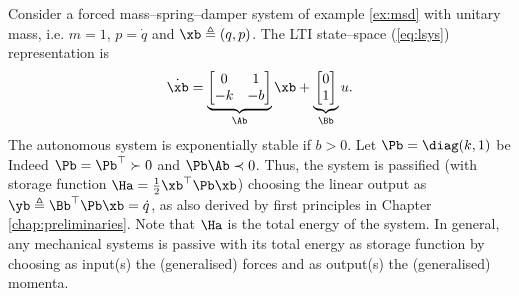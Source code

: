 \begin{exmp}\label{ex:msd_MES}
    Consider a forced mass--spring--damper system of example \ref{ex:msd} with unitary mass, i.e. $m = 1$, $p = \dot{q}$ and $\xb\triangleq (q,p)$.
    The LTI state--space (\ref{eq:lsys}) representation is
    \begin{equation}
        \dot{\xb} = \underbrace{\begin{bmatrix}0&1\\-k&-b\end{bmatrix}}_{\Ab}\xb+ \underbrace{\begin{bmatrix}0\\1\end{bmatrix}}_{\Bb}u.
    \end{equation}
    The autonomous system is exponentially stable if $b>0$. Let $\Pb=\diag({k,1})$ be 
    Indeed $\Pb=\Pb^\top\succ0$ and $\Pb\Ab\prec0$. Thus, the system is passified (with storage function $\Ha = \frac{1}{2}\xb^\top \Pb\xb$) choosing the linear output as $\yb \triangleq \Bb^\top \Pb\xb = \dot{q}$, as also derived by first principles in Chapter \ref{chap:preliminaries}. Note that $\Ha$ is the total energy of the system. In general, any mechanical systems is passive with its total energy as storage function by choosing as input(s) the (generalised) forces and as output(s) the (generalised) momenta.
\end{exmp}
%


